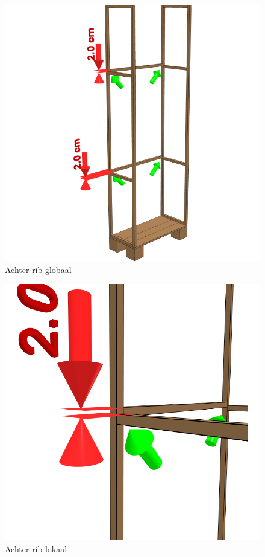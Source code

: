 \documentclass{article}
\begin{document}
\begin{figure}[h!]
    \centering
    \includegraphics[width=\textwidth]{scene 5 - achterrib a.png}
    \caption{Achter rib globaal}
\end{figure}

\begin{figure}[h!]
    \centering
    \includegraphics[width=\textwidth]{scene 5 - achterrib b.png}
    \caption{Achter rib lokaal}
\end{figure}
\end{document}

